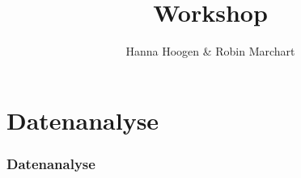 \documentclass[aspectratio=169]{beamer}
\title{Workshop }
\author{Hanna Hoogen \& Robin Marchart}
\institute{TUM Kolleg Wissenschaftstag}
\begin{document}
    \begin{frame}
        
    \end{frame}
    \maketitle
    \section{Datenanalyse}
    \begin{frame}
        \frametitle{Datenanalyse}
        \transfade%
        
    
    \end{frame}
\end{document}
